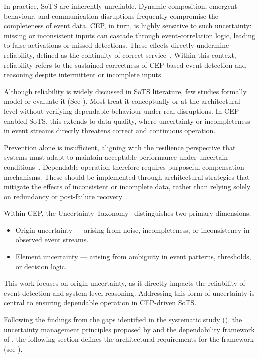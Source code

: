 In practice, SoTS are inherently unreliable. Dynamic composition, emergent behaviour, and communication disruptions frequently compromise the completeness of event data. CEP, in turn, is highly sensitive to such uncertainty: missing or inconsistent inputs can cascade through event-correlation logic, leading to false activations or missed detections. These effects directly undermine reliability, defined as the continuity of correct service~\cite{avizienis2004basic}. Within this context, reliability refers to the sustained correctness of CEP-based event detection and reasoning despite intermittent or incomplete inputs.

Although reliability is widely discussed in SoTS literature, few studies formally model or evaluate it (See ). Most treat it conceptually or at the architectural level without verifying dependable behaviour under real disruptions. In CEP-enabled SoTS, this extends to data quality, where uncertainty or incompleteness in event streams directly threatens correct and continuous operation.

Prevention alone is insufficient, aligning with the resilience perspective that systems must adapt to maintain acceptable performance under uncertain conditions~\cite{madni2020constructing, ed2018deterministic}. Dependable operation therefore requires purposeful compensation mechanisms. These should be implemented through architectural strategies that mitigate the effects of inconsistent or incomplete data, rather than relying solely on redundancy or post-failure recovery~\cite{bukowski2016system}. 

Within CEP, the Uncertainty Taxonomy~\cite{wasserkrug2006taxonomy} distinguishes two primary dimensions:
\begin{itemize}[noitemsep, topsep=0pt]
    \item Origin uncertainty — arising from noise, incompleteness, or inconsistency in observed event streams.
    \item Element uncertainty — arising from ambiguity in event patterns, thresholds, or decision logic.
\end{itemize}
This work focuses on origin uncertainty, as it directly impacts the reliability of event detection and system-level reasoning. Addressing this form of uncertainty is central to ensuring dependable operation in CEP-driven SoTS.

Following the findings from the gaps identified in the systematic study (), the uncertainty management principles proposed by \citet{cugola2015complex} and the dependability framework of \citet{avizienis2004basic}, the following section defines the architectural requirements for the framework (see ).

